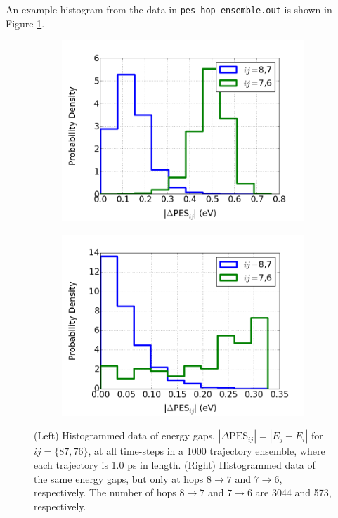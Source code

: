\documentclass[letterpaper,12pt,titlepage]{article}
\begin{document}
An example histogram from the data in \verb+pes_hop_ensemble.out+ is shown in Figure \ref{peshist}.
\begin{figure}[h]
        \centering
        \begin{subfigure}[h]{0.475\textwidth}
            \centering
            \includegraphics[scale=.4]{pes_hist_all.png}
        \end{subfigure}
	\hspace{3mm}
        \begin{subfigure}[h]{0.475\textwidth}  
            \centering 
            \includegraphics[scale=.4]{pes_hist_hops.png}
        \end{subfigure}
        \caption{\small (Left) Histogrammed data of energy gaps, $|\Delta\text{PES}_{ij}|=|E_{j}-E_{i}|$ for $ij=\{87, 76\}$, at all time-steps in a 1000 trajectory ensemble, where each trajectory is 1.0 ps in length.  (Right) Histogrammed data of the same energy gaps, but only at hops $8\rightarrow7$ and $7\rightarrow6$, respectively.  The number of hops $8\rightarrow7$ and $7\rightarrow6$ are 3044 and 573, respectively.}
\label{peshist}
\end{figure}
\end{document}
